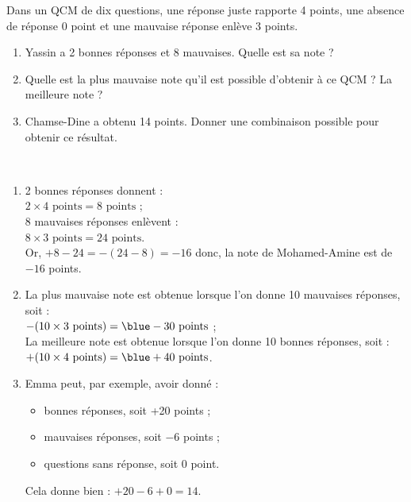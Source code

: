 \begin{exercice*}
   Dans un QCM de dix questions, une réponse juste rapporte 4 points, une absence de réponse 0 point et une mauvaise réponse enlève 3 points.
   \begin{enumerate}
      \item Yassin a 2 bonnes réponses et 8 mauvaises. Quelle est sa note ?
      \item Quelle est la plus mauvaise note qu'il est possible d'obtenir à ce QCM ? La meilleure note ?
      \item Chamse-Dine a obtenu 14 points. Donner une combinaison possible pour obtenir ce résultat.
   \end{enumerate}
\end{exercice*}

\begin{corrige}
   \ \\ [-5mm]
   \begin{enumerate}
      \item 2 bonnes réponses donnent  : \\
         $2\times4\text{ points} =8\text{ points}$ ; \\
         8 mauvaises réponses enlèvent : \\
         $8\times3\text{ points} =24\text{ points}$. \\
         Or, $+8-24 =-(24-8) =-16$ donc, la note de Mohamed-Amine est de {\blue $-16$ points}.
      \item La plus mauvaise note est obtenue lorsque l'on donne 10 mauvaises réponses, soit : \\
         $-(10\times3\text{ points}) =\blue -30\text{ points}$ ; \\
         La meilleure note est obtenue lorsque l'on donne 10 bonnes réponses, soit  : \\
         $+(10\times4\text{ points}) =\blue +40\text{ points}$. \\
      \item Emma peut, par exemple, avoir donné :
         \begin{itemize}
            \item { bonnes réponses}, soit +20 points ;
            \item { mauvaises réponses}, soit $-6$ points ; 
            \item { questions sans réponse}, soit 0 point.
         \end{itemize}
      Cela donne bien : $+20-6+0 =14$.
   \end{enumerate}
\end{corrige}

